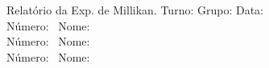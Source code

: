 \documentclass[a4paper,12pt]{article}  %
\author{Prof. Bernardo B. Carvalho}
\date{ Outubro 2014}
\newcommand{\HRule}{\rule{\linewidth}{0.5mm}}
\begin{document}
 



{  \sf  Relatório da Exp. de Millikan.} %
Turno:\underline{\makebox[2cm][l]{~}} Grupo:\underline{\makebox[1cm][l]{~}} Data:\underline{\makebox[2cm][l]{~}}\\
\noindent Número:~\underline{\makebox[2cm][r]{~}} Nome:~\underline{\makebox[10cm][r]{~}} \\
\noindent Número:~\underline{\makebox[2cm][r]{~}} Nome:~\underline{\makebox[10cm][r]{~}} \\
\noindent Número:~\underline{\makebox[2cm][r]{~}} Nome:~\underline{\makebox[10cm][r]{~}} 
\end{document}
